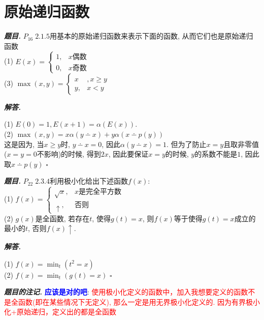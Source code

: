 \documentclass[10pt, a4paper, oneside]{ctexart}
\newenvironment{problem}{\begin{framed}\par\noindent\textbf{\textit{题目. }}}{\end{framed}\par}
\newenvironment{solution}{%
  \par\noindent\textbf{\textit{解答. }}\ignorespaces
}{%
  \hfill\ensuremath{\square}\par
}
\newenvironment{note}{\par\noindent\textbf{\textit{题目的注记. }}\ignorespaces}{\par}
\begin{document}
\section{原始递归函数}

\begin{problem}
$P_{16}\; 2.1.5$用基本的原始递归函数来表示下面的函数, 从而它们也是原始递归函数\\
(1) $E(x)=\begin{cases}
    1, &x\text{偶数}\\
    0, &x\text{奇数}
\end{cases}$\\
(3) $\max(x,y)=\begin{cases}
    x&,x\geq y\\
    y,&x<y
\end{cases}$
\end{problem}
\begin{solution}
(1) $E(0)=1, E(x+1)=\alpha(E(x))$.\\
(2) $\max(x,y)=x\alpha(y\dotminus x)+y\alpha(x \dotminus p(y))$\\
这是因为, 当$x\geq y$时, $y\dotminus x=0$, 因此$\alpha(y\dotminus x)=1$. 但为了防止$x=y$且取非零值($x=y=0$不影响)的时候, 得到$2x$, 因此要保证$x=y$的时候, $y$的系数不能是$1$, 因此取$x\dotminus p(y)$ 
\end{solution}

\begin{problem}
$P_{22}\;2.3.4$利用极小化给出下述函数$f(x)$:\\
(1) $f(x)=\begin{cases}
    \sqrt{x}, &x\text{是完全平方数}\\
    \uparrow, &\text{否则}
\end{cases}$\\
(2) $g(x)$是全函数, 若存在$t$, 使得$g(t)=x$, 则$f(x)$等于使得$g(t)=x$成立的最小的$t$, 否则$f(x)\uparrow$.
\end{problem}
\begin{solution}
(1) $f(x)=\min_{t}(t^2=x)$\\
(2) $f(x)=\min_{t}(g(t)=x)$
\end{solution}
\begin{note}
\textbf{\textcolor{blue}{应该是对的吧}}: \textcolor{red}{使用极小化定义的函数中，加入我想要定义的函数不是全函数(即在某些情况下无定义), 那么一定是用无界极小化定义的. 因为有界极小化+原始递归，定义出的都是全函数}
\end{note}
\end{document}
